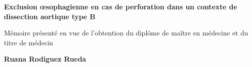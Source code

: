 \documentclass[./tfe.tex]{subfiles}
\begin{document}
\begin{titlepage}

    \begin{center}

        \vspace*{4cm}

        \textbf{\huge Exclusion œsophagienne en cas de perforation dans un contexte de dissection aortique type B}

        \vspace*{2cm}

        \large Mémoire présenté en vue de l'obtention du diplôme de maître en médecine et du titre de médecin

        \vspace{3cm}

        \textbf{Ruana Rodiguez Rueda}

        \vspace{1cm}


        \vspace{2cm}
    \end{center}

\end{titlepage}
\end{document}
